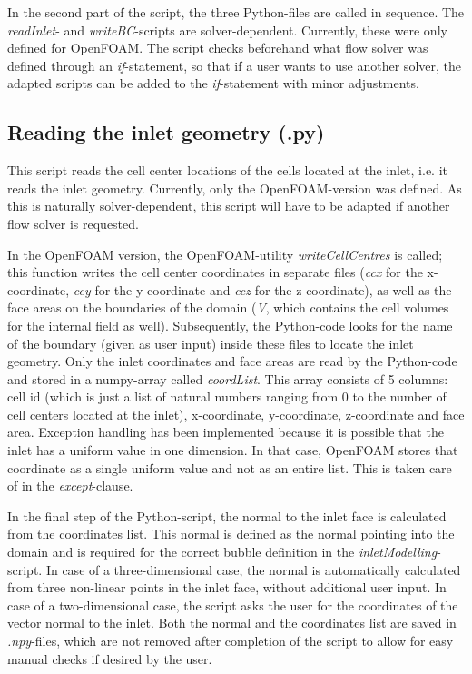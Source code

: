 \documentclass[fleqn,10pt,a4paper,twoside,english]{book}
\begin{document}
\par In the second part of the script, the three Python-files are called in sequence. The \textit{readInlet}- and \textit{writeBC}-scripts are solver-dependent. Currently, these were only defined for OpenFOAM. The script checks beforehand what flow solver was defined through an \textit{if}-statement, so that if a user wants to use another solver, the adapted scripts can be added to the \textit{if}-statement with minor adjustments.
\subsection{Reading the inlet geometry (.py) \label{subparts-reading}}
This script reads the cell center locations of the cells located at the inlet, i.e. it reads the inlet geometry. Currently, only the OpenFOAM-version was defined. As this is naturally solver-dependent, this script will have to be adapted if another flow solver is requested.
\par In the OpenFOAM version, the OpenFOAM-utility \textit{writeCellCentres} is called; this function writes the cell center coordinates in separate files (\textit{ccx} for the x-coordinate, \textit{ccy} for the y-coordinate and \textit{ccz} for the z-coordinate), as well as the face areas on the boundaries of the domain (\textit{V}, which contains the  cell volumes for the internal field as well). Subsequently, the Python-code looks for the name of the boundary (given as user input) inside these files to locate the inlet geometry. Only the inlet coordinates and face areas are read by the Python-code and stored in a numpy-array called \textit{coordList}. This array consists of 5 columns: cell id (which is just a list of natural numbers ranging from 0 to the number of cell centers located at the inlet), x-coordinate, y-coordinate, z-coordinate and face area. Exception handling has been implemented because it is possible that the inlet has a uniform value in one dimension. In that case, OpenFOAM stores that coordinate as a single uniform value and not as an entire list. This is taken care of in the \textit{except}-clause.
\par In the final step of the Python-script, the normal to the inlet face is calculated from the coordinates list. This normal is defined as the normal pointing into the domain and is required for the correct bubble definition in the \textit{inletModelling}-script. In case of a three-dimensional case, the normal is automatically calculated from three non-linear points in the inlet face, without additional user input. In case of a two-dimensional case, the script asks the user for the coordinates of the vector normal to the inlet. Both the normal and the coordinates list are saved in \textit{.npy}-files, which are not removed after completion of the script to allow for easy manual checks if desired by the user.
\end{document}
